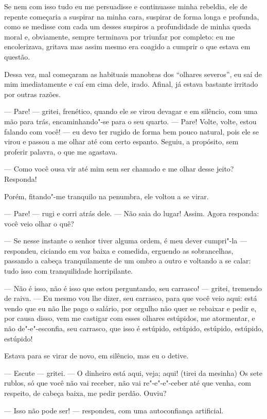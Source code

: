Se nem com isso tudo eu me persuadisse e continuasse minha rebeldia, ele
de repente começaria a suspirar na minha cara, suspirar de forma longa e
profunda, como se medisse com cada um desses suspiros a profundidade de
minha queda moral e, obviamente, sempre terminava por triunfar por
completo: eu me encolerizava, gritava mas assim mesmo era coagido a
cumprir o que estava em questão.

Dessa vez, mal começaram as habituais manobras dos ``olhares severos'',
eu saí de mim imediatamente e caí em cima dele, irado. Afinal, já estava
bastante irritado por outras razões.

--- Pare! --- gritei, frenético, quando ele se virou devagar e em silêncio,
com uma mão para trás, encaminhando"-se para o seu quarto. --- Pare! Volte,
volte, estou falando com você! --- eu devo ter rugido de forma bem pouco
natural, pois ele se virou e passou a me olhar até com certo espanto.
Seguiu, a propósito, sem proferir palavra, o que me agastava.

--- Como você ousa vir até mim sem ser chamado e me olhar desse jeito?
Responda!

Porém, fitando"-me tranquilo na penumbra, ele voltou a se virar.

--- Pare! --- rugi e corri atrás dele. --- Não saia do lugar! Assim. Agora
responda: você veio olhar o quê?

--- Se nesse instante o senhor tiver alguma ordem, é meu dever cumpri"-la
--- respondeu, ciciando em voz baixa e comedida, erguendo as
sobrancelhas, passando a cabeça tranquilamente de um ombro a outro e
voltando a se calar: tudo isso com tranquilidade horripilante.

--- Não é isso, não é isso que estou perguntando, seu carrasco! --- gritei,
tremendo de raiva. --- Eu mesmo vou lhe dizer, seu carrasco, para que você
veio aqui: está vendo que eu não lhe pago o salário, por orgulho não
quer se rebaixar e pedir e, por causa disso, vem me castigar com esses
olhares estúpidos, me atormentar, e não de"-e"-esconfia, seu carrasco, que
isso é estúpido, estúpido, estúpido, estúpido, estúpido!

Estava para se virar de novo, em silêncio, mas eu o detive.

--- Escute --- gritei. --- O dinheiro está aqui, veja; aqui! (tirei da
mesinha) Os sete rublos, só que você não vai receber, não vai
re"-e"-e"-ceber até que venha, com respeito, de cabeça baixa, me pedir
perdão. Ouviu?

--- Isso não pode ser! --- respondeu, com uma autoconfiança artificial.

